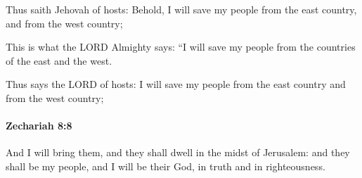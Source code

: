 			\begin{versebox}
					\item[BHS] 
					\item[LXX] 
					\item[ASV] Thus saith Jehovah of hosts: Behold, I will save my people from the east country, and from the west country;
					\item[NIV] This is what the LORD Almighty says: “I will save my people from the countries of the east and the west.
					\item[NRSV] Thus says the LORD of hosts: I will save my people from the east country and from the west country;
			\end{versebox}

		\paragraph{Zechariah 8:8} %
			\label{ZECHARIAH-8-8}

			And I will bring them, and they shall dwell in the midst of Jerusalem: and they shall be my people, and I will be their God, in truth and in righteousness.

